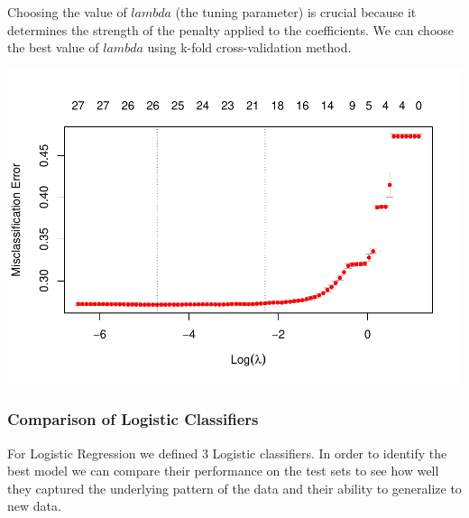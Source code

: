 \documentclass[
  10pt,
  paper=a4,
  ,captions=tableheading
]{scrartcl}
\newenvironment{Shaded}{\begin{snugshade}}{\end{snugshade}}
\newcommand{\AttributeTok}[1]{\textcolor[rgb]{0.13,0.29,0.53}{#1}}
\newcommand{\CommentTok}[1]{\textcolor[rgb]{0.56,0.35,0.01}{\textit{#1}}}
\newcommand{\DecValTok}[1]{\textcolor[rgb]{0.00,0.00,0.81}{#1}}
\newcommand{\FloatTok}[1]{\textcolor[rgb]{0.00,0.00,0.81}{#1}}
\newcommand{\FunctionTok}[1]{\textcolor[rgb]{0.13,0.29,0.53}{\textbf{#1}}}
\newcommand{\NormalTok}[1]{#1}
\newcommand{\OtherTok}[1]{\textcolor[rgb]{0.56,0.35,0.01}{#1}}
\newcommand{\SpecialCharTok}[1]{\textcolor[rgb]{0.81,0.36,0.00}{\textbf{#1}}}
\newcommand{\StringTok}[1]{\textcolor[rgb]{0.31,0.60,0.02}{#1}}
\begin{document}
Choosing the value of \(lambda\) (the tuning parameter) is crucial
because it determines the strength of the penalty applied to the
coefficients. We can choose the best value of \(lambda\) using k-fold
cross-validation method.

\small

\begin{Shaded}
\end{Shaded}

\includegraphics{figs/NET-1.pdf}

\small

\subsubsection{Comparison of Logistic
Classifiers}\label{comparison-of-logistic-classifiers}

For Logistic Regression we defined 3 Logistic classifiers. In order to
identify the best model we can compare their performance on the test
sets to see how well they captured the underlying pattern of the data
and their ability to generalize to new data.
\end{document}
